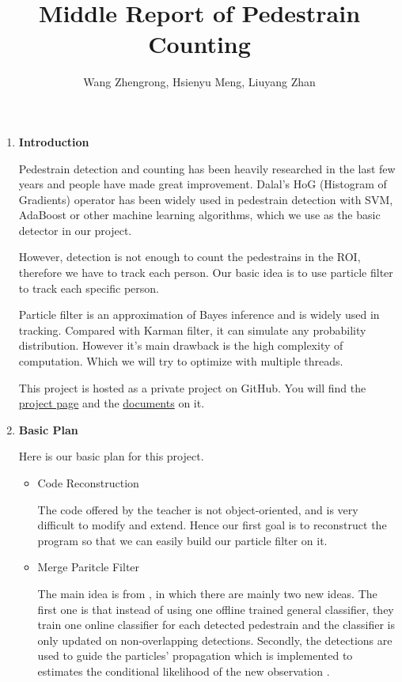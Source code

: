 \documentclass[a4paper]{article}
\title{Middle Report of Pedestrain Counting}
\author{Wang Zhengrong, Hsienyu Meng, Liuyang Zhan}
\begin{document}
\maketitle
\begin{enumerate}
\item \textbf{Introduction}

Pedestrain detection and counting has been heavily researched in the last few years and people have made great improvement. Dalal's HoG (Histogram of Gradients) operator has been widely used in pedestrain detection with SVM, AdaBoost or other machine learning algorithms, which we use as the basic detector in our project.

However, detection is not enough to count the pedestrains in the ROI, therefore we have to track each person. Our basic idea is to use particle filter to track each specific person.

Particle filter is an approximation of Bayes inference and is widely used in tracking. Compared with Karman filter, it can simulate any probability distribution. However it's main drawback is the high complexity of computation. Which we will try to optimize with multiple threads.

This project is hosted as a private project on GitHub. You will find the \href{https://zerowong.github.io/PedestrainCounting}{project page} and the \href{https://zerowong.github.io/PedestrainCounting/docs/html/index.html}{documents} on it.

\item \textbf{Basic Plan}

Here is our basic plan for this project.

\begin{itemize}
\item Code Reconstruction

The code offered by the teacher is not object-oriented, and is very difficult to modify and extend. Hence our first goal is to reconstruct the program so that we can easily build our particle filter on it.

\item Merge Paritcle Filter

The main idea is from \cite{eth_biwi_00633}, in which there are mainly two new ideas. The first one is that instead of using one offline trained general classifier, they train one online classifier for each detected pedestrain and the classifier is only updated on non-overlapping detections. Secondly, the detections are used to guide the particles' propagation which is implemented to estimates the conditional likelihood of the new observation .


\end{itemize}
\end{enumerate}
\end{document}
